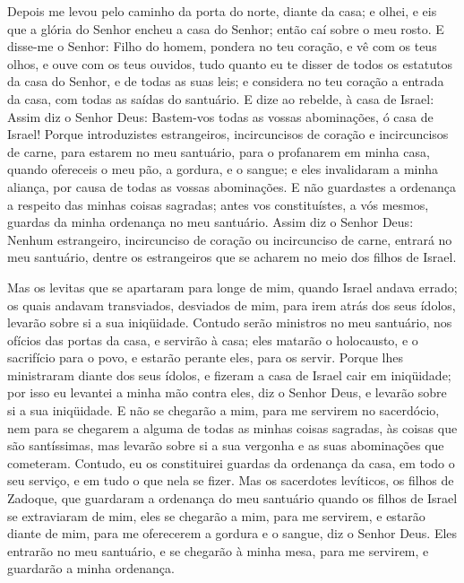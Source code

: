 Depois me levou pelo caminho da porta do norte, diante da casa; e
olhei, e eis que a glória do Senhor encheu a casa do Senhor; então
caí sobre o meu rosto. E disse-me o Senhor: Filho do homem,
pondera no teu coração, e vê com os teus olhos, e ouve com os teus
ouvidos, tudo quanto eu te disser de todos os estatutos da casa do
Senhor, e de todas as suas leis; e considera no teu coração a
entrada da casa, com todas as saídas do santuário. E dize ao
rebelde, à casa de Israel: Assim diz o Senhor Deus: Bastem-vos todas
as vossas abominações, ó casa de Israel! Porque introduzistes
estrangeiros, incircuncisos de coração e incircuncisos de carne,
para estarem no meu santuário, para o profanarem em minha casa,
quando ofereceis o meu pão, a gordura, e o sangue; e eles
invalidaram a minha aliança, por causa de todas as vossas
abominações. E não guardastes a ordenança a respeito das minhas
coisas sagradas; antes vos constituístes, a vós mesmos, guardas da
minha ordenança no meu santuário. Assim diz o Senhor Deus:
Nenhum estrangeiro, incircunciso de coração ou incircunciso de
carne, entrará no meu santuário, dentre os estrangeiros que se
acharem no meio dos filhos de Israel.

Mas os levitas que se apartaram para longe de mim, quando Israel
andava errado; os quais andavam transviados, desviados de mim, para
irem atrás dos seus ídolos, levarão sobre si a sua iniqüidade.
Contudo serão ministros no meu santuário, nos ofícios das
portas da casa, e servirão à casa; eles matarão o holocausto, e o
sacrifício para o povo, e estarão perante eles, para os servir.
Porque lhes ministraram diante dos seus ídolos, e fizeram a
casa de Israel cair em iniqüidade; por isso eu levantei a minha mão
contra eles, diz o Senhor Deus, e levarão sobre si a sua iniqüidade.
E não se chegarão a mim, para me servirem no sacerdócio, nem
para se chegarem a alguma de todas as minhas coisas sagradas, às
coisas que são santíssimas, mas levarão sobre si a sua vergonha e as
suas abominações que cometeram. Contudo, eu os constituirei
guardas da ordenança da casa, em todo o seu serviço, e em tudo o que
nela se fizer. Mas os sacerdotes levíticos, os filhos de
Zadoque, que guardaram a ordenança do meu santuário quando os filhos
de Israel se extraviaram de mim, eles se chegarão a mim, para me
servirem, e estarão diante de mim, para me oferecerem a gordura e o
sangue, diz o Senhor Deus. Eles entrarão no meu santuário, e
se chegarão à minha mesa, para me servirem, e guardarão a minha
ordenança.

